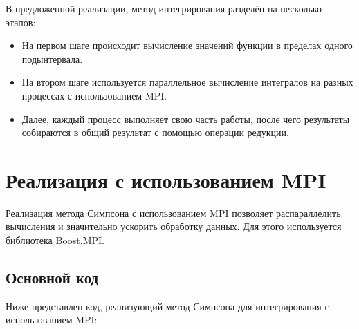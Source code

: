 \documentclass{article}
\begin{document}
В предложенной реализации, метод интегрирования разделён на несколько этапов:
\begin{itemize}
    \item На первом шаге происходит вычисление значений функции в пределах одного подынтервала.
    \item На втором шаге используется параллельное вычисление интегралов на разных процессах с использованием MPI.
    \item Далее, каждый процесс выполняет свою часть работы, после чего результаты собираются в общий результат с помощью операции редукции.
\end{itemize}

\section{Реализация с использованием MPI}
Реализация метода Симпсона с использованием MPI позволяет распараллелить вычисления и значительно ускорить обработку данных. Для этого используется библиотека Boost.MPI.

\subsection{Основной код}
Ниже представлен код, реализующий метод Симпсона для интегрирования с использованием MPI:
\end{document}
